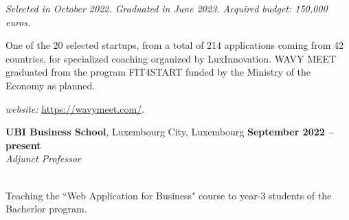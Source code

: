 \documentclass[margin,line]{resume}
\begin{document}
\begin{resume}
\begin{list2}
	\emph{Selected in October 2022. Graduated in June 2023. Acquired budget: 150,000 euros.}
	
	One of the 20 selected startups, from a total of 214 applications coming from 42 countries, for specialized coaching organized by LuxInnovation. WAVY MEET graduated from the program FIT4START funded by the Ministry of the Economy as planned.
	
	\item \filbreak\textit{website:} \url{https://wavymeet.com/}.
\end{list2}

\textbf{UBI Business School}, Luxembourg City, Luxembourg \hfill \textbf{September 2022 -- present}\\
\textit{Adjunct Professor}\hfill\\
\vspace{-3mm}\\\vspace{-1mm}
\begin{list2}
	\item \filbreak Teaching the ``Web Application for Business" course to year-3 students of the Bacherlor program.
	\end{list2}


\end{resume}
\end{document}
